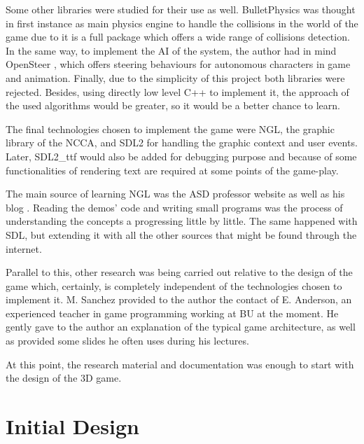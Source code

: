\documentclass[]{article}
\begin{document}
 Some other libraries were studied for their use as well. BulletPhysics \cite{bulletPhysics} was thought in first instance as main physics engine to handle the collisions in the world of the game
 due to it is a full package which offers a wide range of collisions detection. In the same way, to implement the AI of the system, the author had in mind OpenSteer \cite{openSteer}, which offers
 steering behaviours for autonomous characters in game and animation. Finally, due to the simplicity of this project both libraries were rejected. Besides, using directly
 low level C++ to implement it, the approach of the used algorithms would be greater, so it would be a better chance to learn.
 
 The final technologies chosen to implement the game were NGL, the graphic library of the NCCA, and SDL2 for handling the graphic context and user events. Later, SDL2\_ttf would also be
 added for debugging purpose and because of some functionalities of rendering text are required at some points of the game-play.
 
 The main source of learning NGL was the ASD professor website \cite{maceyWebsite} as well as his blog \cite{maceyBlog}. Reading the demos' code and writing small programs was the process of understanding the concepts a progressing 
 little by little. The same happened with SDL, but extending it with all the other sources that might be found through the internet.
 
 Parallel to this, other research was being carried out relative to the design of the game which, certainly, is completely independent of the technologies chosen to implement it. M. Sanchez provided
 to the author the contact of E. Anderson, an experienced teacher in game programming working at BU at the moment. He gently gave to the author an explanation of the typical game architecture, as well as provided 
 some slides he often uses during his lectures.
 
 At this point, the research material and documentation was enough to start with the design of the 3D game.

 

\section{Initial Design}
\end{document}
